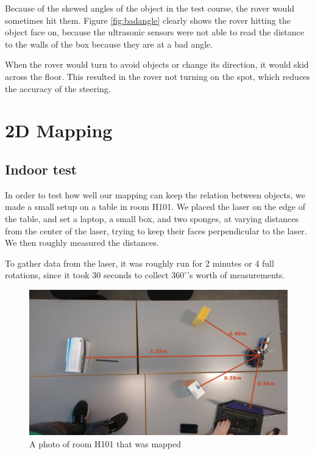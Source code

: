 Because of the skewed angles of the object in the test course, the rover would sometimes hit them. Figure \ref{fig:badangle} clearly shows the rover hitting the object face on, because the ultrasonic sensors were not able to read the distance to the walls of the box because they are at a bad angle.

When the rover would turn to avoid objects or change its direction, it would skid across the floor. This resulted in the rover not turning on the spot, which reduces the accuracy of the steering.

\clearpage
\section{2D Mapping}

\subsection{Indoor test}
In order to test how well our mapping can keep the relation between objects, we made a small setup on a table in room H101. We placed the laser on the edge of the table, and set a laptop, a small box, and two sponges, at varying distances from the center of the laser, trying to keep their faces perpendicular to the laser. We then roughly measured the distances.

To gather data from the laser, it was roughly run for 2 minutes or 4 full rotations, since it took 30 seconds to collect $360^\circ$'s worth of measurements.

\begin{figure}[H]
	\centering
	\includegraphics[scale=.4]{images/h101-photo.jpg}
	\caption{A photo of room H101 that was mapped}
	\label{fig:laser-test}
\end{figure}
	
